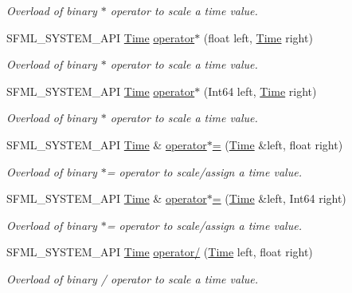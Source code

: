\begin{DoxyCompactItemize}
\begin{DoxyCompactList}\small\item\em Overload of binary $\ast$ operator to scale a time value. \end{DoxyCompactList}\item 
S\+F\+M\+L\+\_\+\+S\+Y\+S\+T\+E\+M\+\_\+\+A\+PI \hyperlink{classsf_1_1_time}{Time} \hyperlink{classsf_1_1_time_a63723c9e9c5ff6151377ec4350c6f36e}{operator$\ast$} (float left, \hyperlink{classsf_1_1_time}{Time} right)
\begin{DoxyCompactList}\small\item\em Overload of binary $\ast$ operator to scale a time value. \end{DoxyCompactList}\item 
S\+F\+M\+L\+\_\+\+S\+Y\+S\+T\+E\+M\+\_\+\+A\+PI \hyperlink{classsf_1_1_time}{Time} \hyperlink{classsf_1_1_time_a40a6d0938fb4a43731d54fd90bfc6476}{operator$\ast$} (Int64 left, \hyperlink{classsf_1_1_time}{Time} right)
\begin{DoxyCompactList}\small\item\em Overload of binary $\ast$ operator to scale a time value. \end{DoxyCompactList}\item 
S\+F\+M\+L\+\_\+\+S\+Y\+S\+T\+E\+M\+\_\+\+A\+PI \hyperlink{classsf_1_1_time}{Time} \& \hyperlink{classsf_1_1_time_a8996b6a6fcb8f3854b486b8e43949b50}{operator$\ast$=} (\hyperlink{classsf_1_1_time}{Time} \&left, float right)
\begin{DoxyCompactList}\small\item\em Overload of binary $\ast$= operator to scale/assign a time value. \end{DoxyCompactList}\item 
S\+F\+M\+L\+\_\+\+S\+Y\+S\+T\+E\+M\+\_\+\+A\+PI \hyperlink{classsf_1_1_time}{Time} \& \hyperlink{classsf_1_1_time_a6656a0a1a1802009a72d93fbba61f24a}{operator$\ast$=} (\hyperlink{classsf_1_1_time}{Time} \&left, Int64 right)
\begin{DoxyCompactList}\small\item\em Overload of binary $\ast$= operator to scale/assign a time value. \end{DoxyCompactList}\item 
S\+F\+M\+L\+\_\+\+S\+Y\+S\+T\+E\+M\+\_\+\+A\+PI \hyperlink{classsf_1_1_time}{Time} \hyperlink{classsf_1_1_time_a3386c392dbc62e51dfa59730854d1ed2}{operator/} (\hyperlink{classsf_1_1_time}{Time} left, float right)
\begin{DoxyCompactList}\small\item\em Overload of binary / operator to scale a time value. \end{DoxyCompactList}\item 

\end{DoxyCompactItemize}
